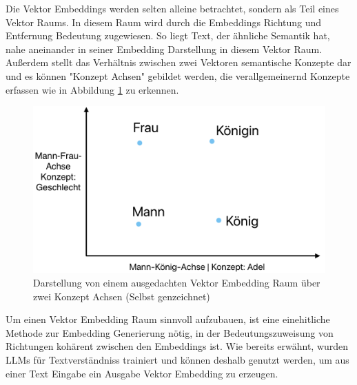 \documentclass[../main.tex]{subfiles}
\begin{document}
Die Vektor Embeddings werden selten alleine betrachtet, sondern als Teil eines Vektor Raums.
In diesem Raum wird durch die Embeddings Richtung und Entfernung Bedeutung zugewiesen.
So liegt Text, der ähnliche Semantik hat, nahe aneinander in seiner Embedding Darstellung in diesem Vektor Raum.
Außerdem stellt das Verhältnis zwischen zwei Vektoren semantische Konzepte dar und es können "Konzept Achsen" gebildet werden, die verallgemeinernd Konzepte erfassen wie in Abbildung \ref{fig:embeddingspace} zu erkennen.
\cite{heimerl2018interactive,mikolov2013efficient}

\begin{figure}[ht]
    \centering
    \includegraphics[scale=.23]{"bilder/embeddingspace.png"}
    \caption{Darstellung von einem ausgedachten Vektor Embedding Raum über zwei Konzept Achsen (Selbst genzeichnet)}
    \label{fig:embeddingspace}
\end{figure}

Um einen Vektor Embedding Raum sinnvoll aufzubauen, ist eine einehitliche Methode zur Embedding Generierung nötig, in der Bedeutungszuweisung von Richtungen kohärent zwischen den Embeddings ist.
Wie bereits erwähnt, wurden \glspl{LLM} für Textverständniss trainiert und können deshalb genutzt werden, um aus einer Text Eingabe ein Ausgabe Vektor Embedding zu erzeugen.
\cite{zhang2023language}
\end{document}
